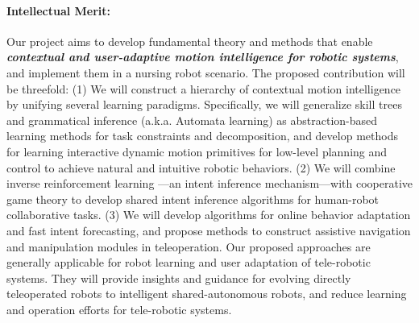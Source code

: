 \documentclass[letterpaper, 11 pt, onecolumn]{article}
\begin{document}
\paragraph*{Intellectual Merit:} Our project aims to develop fundamental theory and methods that enable \textit{\textbf{contextual and user-adaptive motion intelligence for robotic systems}}, and implement them in a nursing robot scenario. The proposed contribution will be threefold: (1) We will construct a hierarchy of contextual motion intelligence by unifying several learning paradigms. Specifically, we will generalize skill trees \cite{konidaris2012robot} and grammatical inference \cite{de2010grammatical} (a.k.a. Automata learning) as abstraction-based learning methods for task constraints and decomposition, and develop methods for learning interactive dynamic motion primitives for low-level planning and control to achieve natural and intuitive robotic behaviors. (2) We will combine inverse reinforcement learning ---an intent inference mechanism---with cooperative game theory to develop shared intent inference algorithms for human-robot collaborative tasks. (3) We will develop algorithms for online behavior adaptation and fast intent forecasting, and propose methods to construct assistive navigation and manipulation modules in teleoperation. Our proposed approaches are generally applicable for robot learning and user adaptation of tele-robotic systems. They will provide insights and guidance for evolving directly teleoperated robots to intelligent shared-autonomous robots, and reduce learning and operation efforts for tele-robotic systems.

\end{document}
